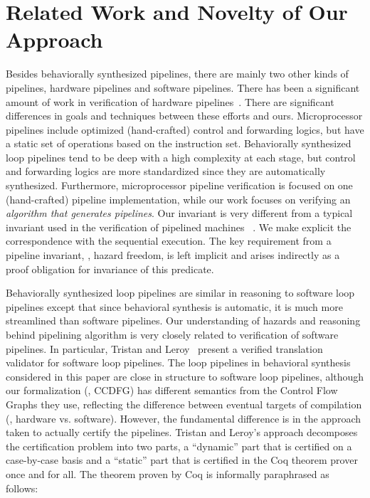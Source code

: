 \section{Related Work and Novelty of Our Approach}
\label{sec:related-work}

Besides behaviorally synthesized pipelines, there are mainly two other kinds of pipelines, hardware pipelines and software pipelines. 
There has been a significant amount of work in verification of hardware pipelines~\cite{pvs,Cyrluk94, bd:pipeline, sh:pipeline}. 
There are significant differences in goals
and techniques between these efforts and ours.
Microprocessor pipelines include optimized (hand-crafted)
control and forwarding logics, but have a static set of
operations based on the instruction set. Behaviorally synthesized 
loop pipelines tend to be deep with a high complexity at each stage, but
control and forwarding logics are more standardized since
they are automatically synthesized. 
Furthermore, microprocessor pipeline verification
is focused on one (hand-crafted) pipeline implementation,
while our work focuses on verifying an {\em algorithm
that generates pipelines}. Our invariant is very different from a typical invariant
used in the verification of pipelined machines~\cite{sh:pipeline} . We make explicit the
correspondence with the sequential execution. The key
requirement from a pipeline invariant, \viz, hazard freedom,
is left implicit and arises indirectly as a proof obligation
for invariance of this predicate. 
 
Behaviorally synthesized loop pipelines are similar in reasoning to software loop pipelines except that since
behavioral synthesis is automatic, it is much more streamlined than software pipelines. 
Our understanding of hazards and reasoning behind pipelining algorithm 
is very closely related to verification of software pipelines.  In particular, Tristan
and Leroy~\cite{tl:software-popl10} present a verified
translation validator for software loop pipelines.  The loop
pipelines in behavioral synthesis considered in this paper
are close in structure to software loop pipelines, although
our formalization (\eg, CCDFG) has different semantics from
the Control Flow Graphs they use, reflecting the difference
between eventual targets of compilation (\viz, hardware
vs. software).  However, the fundamental difference is in
the approach taken to actually certify the pipelines.
Tristan and Leroy's approach decomposes the certification
problem into two parts, a ``dynamic'' part that is certified
on a case-by-case basis  and a ``static'' part that is
certified in the Coq theorem prover~\cite{coq} once and for all.  The
theorem proven by Coq is informally paraphrased as follows:

